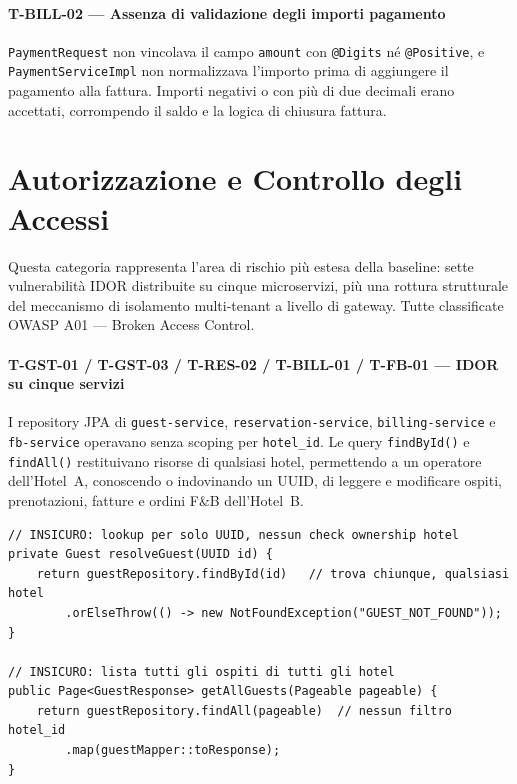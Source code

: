 ﻿\documentclass[a4paper,12pt]{report}
\begin{document}
\paragraph{T-BILL-02 — Assenza di validazione degli importi pagamento}
\texttt{PaymentRequest} non vincolava il campo \texttt{amount} con \texttt{@Digits} né
\texttt{@Positive}, e \texttt{PaymentServiceImpl} non normalizzava l'importo prima di
aggiungere il pagamento alla fattura. Importi negativi o con più di due decimali erano
accettati, corrompendo il saldo e la logica di chiusura fattura.

\section{Autorizzazione e Controllo degli Accessi}

Questa categoria rappresenta l'area di rischio più estesa della baseline: sette
vulnerabilità IDOR distribuite su cinque microservizi, più una rottura strutturale
del meccanismo di isolamento multi-tenant a livello di gateway.
Tutte classificate OWASP A01 --- Broken Access Control.

\paragraph{T-GST-01 / T-GST-03 / T-RES-02 / T-BILL-01 / T-FB-01 — IDOR su cinque servizi}
I repository JPA di \texttt{guest-service}, \texttt{reservation-service},
\texttt{billing-service} e \texttt{fb-service} operavano senza scoping per
\texttt{hotel\_id}. Le query \texttt{findById()} e \texttt{findAll()} restituivano
risorse di qualsiasi hotel, permettendo a un operatore dell'Hotel~A, conoscendo
o indovinando un UUID, di leggere e modificare ospiti, prenotazioni, fatture e
ordini F\&B dell'Hotel~B.

\begin{insecurebox}[title={Pattern IDOR --- GuestServiceImpl.java (baseline)}]
\begin{lstlisting}[style=java]
// INSICURO: lookup per solo UUID, nessun check ownership hotel
private Guest resolveGuest(UUID id) {
    return guestRepository.findById(id)   // trova chiunque, qualsiasi hotel
        .orElseThrow(() -> new NotFoundException("GUEST_NOT_FOUND"));
}

// INSICURO: lista tutti gli ospiti di tutti gli hotel
public Page<GuestResponse> getAllGuests(Pageable pageable) {
    return guestRepository.findAll(pageable)  // nessun filtro hotel_id
        .map(guestMapper::toResponse);
}
\end{lstlisting}
\end{insecurebox}
\end{document}
